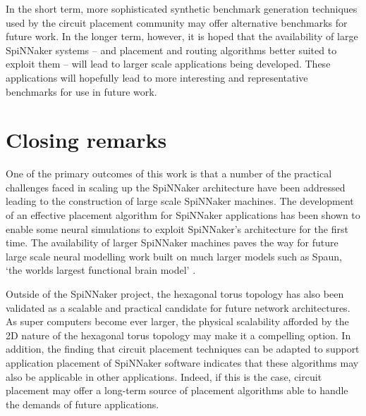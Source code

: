 			In the short term, more sophisticated synthetic benchmark generation
			techniques used by the circuit placement community \cite{nam07} may offer
			alternative benchmarks for future work. In the longer term, however, it
			is hoped that the availability of large SpiNNaker systems -- and
			placement and routing algorithms better suited to exploit them -- will
			lead to larger scale applications being developed. These applications
			will hopefully lead to more interesting and representative benchmarks for
			use in future work.
	
	\section{Closing remarks}
		
		One of the primary outcomes of this work is that a number of the practical
		challenges faced in scaling up the SpiNNaker architecture have been
		addressed leading to the construction of large scale SpiNNaker machines.
		The development of an effective placement algorithm for SpiNNaker
		applications has been shown to enable some neural simulations to exploit
		SpiNNaker's architecture for the first time. The availability of larger
		SpiNNaker machines paves the way for future large scale neural modelling
		work built on much larger models such as Spaun, `the worlds largest
		functional brain model' \cite{eliasmith12}.
		
		Outside of the SpiNNaker project, the hexagonal torus topology has also
		been validated as a scalable and practical candidate for future network
		architectures. As super computers become ever larger, the physical
		scalability afforded by the 2D nature of the hexagonal torus topology may
		make it a compelling option. In addition, the finding that circuit
		placement techniques can be adapted to support application placement of
		SpiNNaker software indicates that these algorithms may also be applicable
		in other applications. Indeed, if this is the case, circuit placement may
		offer a long-term source of placement algorithms able to handle the demands
		of future applications.
		
		
